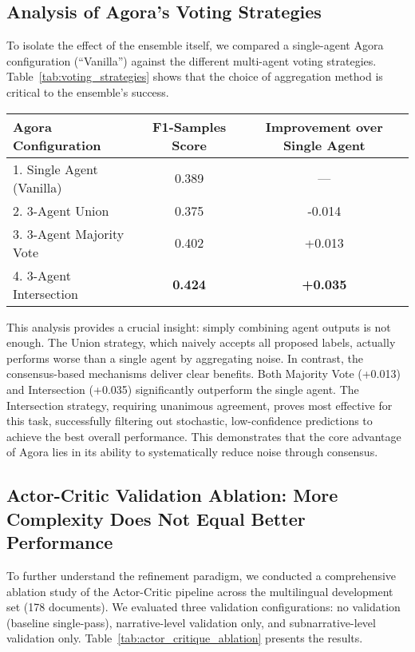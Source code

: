\subsection{Analysis of Agora's Voting Strategies}

To isolate the effect of the ensemble itself, we compared a single-agent Agora configuration (``Vanilla'') against the different multi-agent voting strategies. Table~\ref{tab:voting_strategies} shows that the choice of aggregation method is critical to the ensemble's success.

\begin{table*}[!ht]
\centering
\caption{Ablation of Agora Configurations on the English Dataset (F1-Samples).}
\label{tab:voting_strategies}
\begin{tabular}{lcc}
\hline
\textbf{Agora Configuration} & \textbf{F1-Samples Score} & \textbf{Improvement over Single Agent} \\
\hline
1. Single Agent (Vanilla) & 0.389 & --- \\
2. 3-Agent Union & 0.375 & -0.014 \\
3. 3-Agent Majority Vote & 0.402 & +0.013 \\
4. 3-Agent Intersection & \textbf{0.424} & \textbf{+0.035} \\
\hline
\end{tabular}
\end{table*}

This analysis provides a crucial insight: simply combining agent outputs is not enough. The Union strategy, which naively accepts all proposed labels, actually performs worse than a single agent by aggregating noise. In contrast, the consensus-based mechanisms deliver clear benefits. Both Majority Vote (+0.013) and Intersection (+0.035) significantly outperform the single agent. The Intersection strategy, requiring unanimous agreement, proves most effective for this task, successfully filtering out stochastic, low-confidence predictions to achieve the best overall performance. This demonstrates that the core advantage of Agora lies in its ability to systematically reduce noise through consensus.

\subsection{Actor-Critic Validation Ablation: More Complexity Does Not Equal Better Performance}

To further understand the refinement paradigm, we conducted a comprehensive ablation study of the Actor-Critic pipeline across the multilingual development set (178 documents). We evaluated three validation configurations: no validation (baseline single-pass), narrative-level validation only, and subnarrative-level validation only. Table~\ref{tab:actor_critique_ablation} presents the results.

